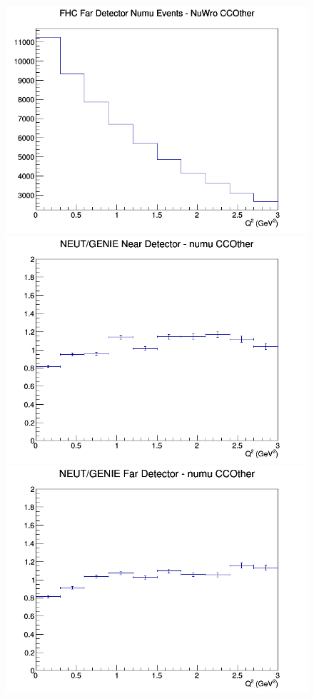 \begin{figure}[h]
\endminipage
{}
\includegraphics[width=\linewidth]{eff_Q2/LAr/CCOther_FHC_FD_numu_Q2_NuWro.png}
\endminipage
\newline
{}
\includegraphics[width=\linewidth]{eff_Q2/LAr/ratios/CCOther_NEUT_GENIE_numu_near_Q2.png}
\endminipage
{}
\includegraphics[width=\linewidth]{eff_Q2/LAr/ratios/CCOther_NEUT_GENIE_numu_far_Q2.png}

\end{figure}
